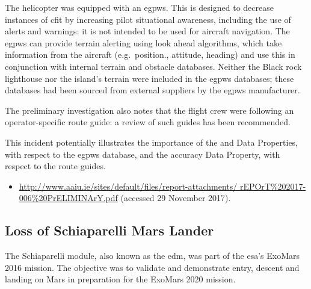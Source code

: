 The helicopter was equipped with an \gls{egpws}. This is designed to decrease instances of \gls{cfit} by increasing pilot situational awareness, including the use of alerts and warnings: it is not intended to be used for aircraft navigation. The \gls{egpws} can provide terrain alerting using look ahead algorithms, which take \gls{information} from the aircraft (e.g.\ position., attitude, heading) and use this in conjunction with internal terrain and obstacle \glspl{database}. Neither the Black rock lighthouse nor the island's terrain were included in the \gls{egpws} \glspl{database}; these \glspl{database} had been sourced from external suppliers by the \gls{egpws} manufacturer.

The preliminary investigation also notes that the flight crew were following an operator-specific route guide: a review of such guides has been recommended.

This incident potentially illustrates the importance of the  and  Data Properties, with respect to the \gls{egpws} \gls{database}, and the \gls{accuracy} Data Property, with respect to the route guides.

\begin{samepage}
\begin{itemize}
  \item \raggedright{\href{http://www.aaiu.ie/sites/default/files/report-attachments/rEPOrT\%202017-006\%20PrELIMINArY.pdf}{http://www.aaiu.ie/sites/default/files/report-attachments/ rEPOrT\%202017-006\%20PrELIMINArY.pdf} (accessed 29 November 2017).}
\end{itemize}
\end{samepage}


\subsection{Loss of Schiaparelli Mars Lander} \label{bkm:incacc:schiaparelli}
The Schiaparelli module, also known as the \gls{edm}, was part of the \gls{esa}'s ExoMars 2016 mission. The objective was to validate and demonstrate entry, descent and landing on Mars in preparation for the ExoMars 2020 mission.

